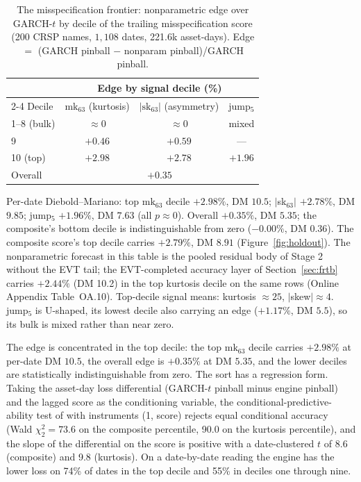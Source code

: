 \documentclass[11pt]{article}
\theoremstyle{remark}
\begin{document}
\begin{table}[t]
\centering
\begin{threeparttable}
\caption{The misspecification frontier: nonparametric edge over
GARCH-$t$ by decile of the trailing misspecification score (200 CRSP
names, $1{,}108$ dates, 221.6k asset-days). Edge $=$ (GARCH pinball $-$ nonparam
pinball)/GARCH pinball.}
\label{tab:frontier}
\begin{tabular}{lccc}
\toprule
& \multicolumn{3}{c}{Edge by signal decile (\%)} \\
\cmidrule(lr){2-4}
Decile & $\mathrm{mk}_{63}$ (kurtosis) & $|\mathrm{sk}_{63}|$ (asymmetry) & jump$_5$ \\
\midrule
1--8 (bulk) & $\approx 0$ & $\approx 0$ & mixed \\
9 & $+0.46$ & $+0.59$ & --- \\
10 (top) & $\mathbf{+2.98}$ & $\mathbf{+2.78}$ & $+1.96$ \\
\midrule
Overall & \multicolumn{3}{c}{$+0.35$} \\
\bottomrule
\end{tabular}
\begin{tablenotes}\footnotesize
\item Per-date Diebold--Mariano: top $\mathrm{mk}_{63}$ decile
$+2.98\%$, DM $10.5$; $|$sk$_{63}|$ $+2.78\%$, DM $9.85$; jump$_5$
$+1.96\%$, DM $7.63$ (all $p \approx 0$). Overall $+0.35\%$, DM $5.35$;
the composite's bottom decile is indistinguishable from zero ($-0.00\%$, DM $0.36$).
The composite score's top decile carries $+2.79\%$, DM $8.91$
(Figure~\ref{fig:holdout}). The nonparametric forecast in this table is the pooled residual body of Stage 2 without the EVT tail; the EVT-completed accuracy layer of Section~\ref{sec:frtb} carries $+2.44\%$ (DM 10.2) in the top kurtosis decile on the same rows (Online Appendix Table~OA.10). Top-decile signal means: kurtosis
$\approx 25$, $|$skew$| \approx 4$. jump$_5$ is U-shaped, its lowest
decile also carrying an edge ($+1.17\%$, DM $5.5$), so its bulk is mixed
rather than near zero.
\end{tablenotes}
\end{threeparttable}
\end{table}

The edge is concentrated in the top decile: the top $\mathrm{mk}_{63}$ decile
carries $+2.98\%$ at per-date DM $10.5$, the overall edge is $+0.35\%$ at
DM $5.35$, and the lower deciles are statistically indistinguishable
from zero. The sort has a regression form. Taking the asset-day loss differential (GARCH-$t$ pinball minus engine pinball) and the lagged score as the conditioning variable, the conditional-predictive-ability test of \citet{giacominiwhite2006} with instruments (1, score) rejects equal conditional accuracy (Wald $\chi^2_2=73.6$ on the composite percentile, 90.0 on the kurtosis percentile), and the slope of the differential on the score is positive with a date-clustered $t$ of 8.6 (composite) and 9.8 (kurtosis). On a date-by-date reading the engine has the lower loss on 74\% of dates in the top decile and 55\% in deciles one through nine.
\end{document}
